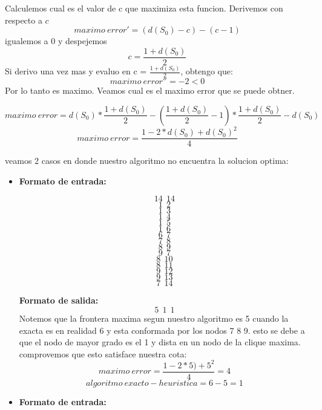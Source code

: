 \begin{itemize}
Calculemos cual es el valor de c que maximiza esta funcion. Derivemos con respecto a $c$
\begin{equation}
  maximo\ error' = (d(S_{0}) - c) - (c - 1)
\end{equation} 
igualemos a 0 y despejemos
\begin{equation}
  c = \frac{1 + d(S_{0})}{2}
\end{equation} 
Si derivo una vez mas y evaluo en c = $\frac{1 + d(S_{0})}{2}$, obtengo que:
\begin{equation}
  maximo\ error'' = -2 < 0
\end{equation}
Por lo tanto es maximo.\newline \newline
Veamos cual es el maximo error que se puede obtner.

\begin{equation}
  maximo\ error = d(S_{0}) * \frac{1 + d(S_{0})}{2} - (\frac{1 + d(S_{0})}{2} - 1) * \frac{1 + d(S_{0})}{2} - d(S_{0}) 
\end{equation} 
\begin{equation}
  maximo\ error = \frac{1 - 2 * d(S_{0}) + d(S_{0})^{2}}{4} 
\end{equation}

veamos 2 casos en donde nuestro algoritmo no encuentra la solucion optima:
\begin {itemize}
\item
\textbf{Formato de entrada:}

$$14\ \  14$$
$$1\ \  2$$
$$1\ \  3$$
$$1\ \  4$$
$$1\ \  5$$
$$1\ \  6$$
$$6\ \  7$$
$$7 \ \ 8$$
$$8\ \  9$$
$$9\ \  7$$
$$8\ \  10$$
$$8\ \  11$$
$$9\ \  12$$
$$9\ \  13$$
$$7\ \  14$$


\textbf{Formato de salida:}
$$5\ \   1\ \   1$$
Notemos que la frontera maxima segun nuestro algoritmo es 5 cuando la exacta es en realidad 6 y esta conformada por los nodos 7 8 9. esto se debe a que el nodo de mayor grado es el 1 y dista en un nodo de la clique maxima. 
\newline
comprovemos que esto satisface nuestra cota:
\begin{equation}
  maximo\ error = \frac{1 - 2 * 5) + 5^{2}}{4} = 4
\end{equation}
\begin{equation}
  algoritmo\ exacto - heuristica = 6 - 5 = 1
\end{equation}

\item
\textbf{Formato de entrada:}


\end{itemize}
\end{itemize}
